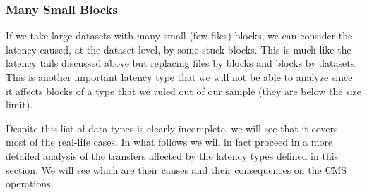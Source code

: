 \subsubsection*{Many Small Blocks}
If we take large datasets with many small (few files) blocks, we can
consider the latency caused, at the dataset level, by some stuck
blocks. This is much like the latency tails discussed above but
replacing files by blocks and blocks by datasets.  This is another
important latency type that we will not be able to analyze since it
affects blocks of a type that we ruled out of our sample (they are
below the size limit).

\bigskip
Despite this list of data types is clearly incomplete, we will see
that it covers most of the real-life cases. In what follows we will in
fact proceed in a more detailed analysis of the transfers affected by
the latency types defined in this section. We will see which are their
causes and their consequences on the CMS operations.
